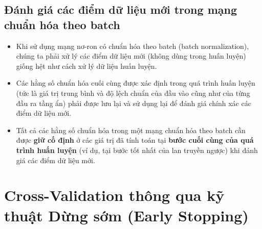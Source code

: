 \documentclass{book}
\begin{document}
    \subsection{Đánh giá các điểm dữ liệu mới trong mạng chuẩn hóa theo batch}
    \begin{itemize}
        \item Khi sử dụng mạng nơ-ron có chuẩn hóa theo batch (batch normalization), chúng ta phải xử lý các điểm dữ liệu mới (không dùng trong huấn luyện) giống hệt như cách xử lý dữ liệu huấn luyện.
        \item Các hằng số chuẩn hóa cuối cùng được xác định trong quá trình huấn luyện (tức là giá trị trung bình và độ lệch chuẩn của đầu vào cũng như của từng đầu ra tầng ẩn) phải được lưu lại và sử dụng lại để đánh giá chính xác các điểm dữ liệu mới.
        \item Tất cả các hằng số chuẩn hóa trong một mạng chuẩn hóa theo batch cần được \textbf{giữ cố định} ở các giá trị đã tính toán tại \textbf{bước cuối cùng của quá trình huấn luyện} (ví dụ, tại bước tốt nhất của lan truyền ngược) khi đánh giá các điểm dữ liệu mới.
    \end{itemize}
    
\section{Cross-Validation thông qua kỹ thuật Dừng sớm (Early Stopping)}
\end{document}
